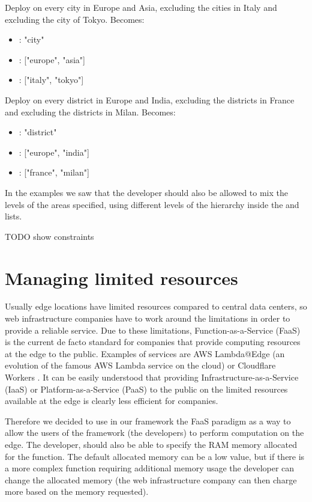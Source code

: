 \begin{example}
Deploy on every city in Europe and Asia, excluding the cities in Italy and excluding the city of Tokyo.
Becomes:
\begin{itemize}
    \item {}: "city"
    \item {}: ["europe", "asia"]
     \item {}: ["italy", "tokyo"]
\end{itemize}
\end{example}

\begin{example}
Deploy on every district in Europe and India, excluding the districts in France and excluding the districts in Milan.
Becomes:
\begin{itemize}
    \item {}: "district"
    \item {}: ["europe", "india"]
     \item {}: ["france", "milan"]
\end{itemize}
\end{example}

In the examples we saw that the developer should also be allowed to mix the levels of the areas specified, using different levels of the hierarchy inside the  and  lists.

TODO show constraints


\section{Managing limited resources}
Usually edge locations have limited resources compared to central data centers, so web infrastructure companies have to work around the limitations in order to provide a reliable service.
Due to these limitations, Function-as-a-Service (FaaS) is the current de facto standard for companies that provide computing resources at the edge to the public. Examples of services are AWS Lambda@Edge (an evolution of the famous AWS Lambda service on the cloud) \cite{aws-lambda-at-edge} or Cloudflare Workers \cite{cloudflare-workers}. It can be easily understood that providing Infrastructure-as-a-Service (IaaS) or Platform-as-a-Service (PaaS) to the public on the limited resources available at the edge is clearly less efficient for companies.

Therefore we decided to use in our framework the FaaS paradigm as a way to allow the users of the framework (the developers) to perform computation on the edge. The developer, should also be able to specify the RAM memory allocated for the function. The default allocated memory can be a low value, but if there is a more complex function requiring additional memory usage the developer can change the allocated memory (the web infrastructure company can then charge more based on the memory requested).

